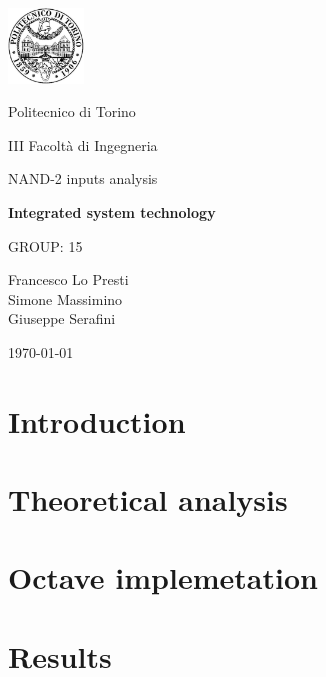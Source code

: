 \documentclass[12pt,  english, makeidx, a4paper, titlepage, oneside]{article}
\begin{document}
\begin{titlepage}
\vspace{2cm}
\centerline{
\includegraphics[width=2cm]{./img/logopoli.eps}}  
\centerline{\LARGE Politecnico di Torino}
\bigskip
\centerline{\Large III Facolt\`a di Ingegneria}
\vspace{4cm}
\centerline{\Huge\sf NAND-2 inputs analysis}
\bigskip
\centerline{\Huge\bfseries\sf Integrated system technology}
\vspace{2cm}
\centerline{\Large GROUP: 15}
\vspace{2cm}
\centerline{\Large Francesco Lo Presti\\Simone Massimino\\Giuseppe Serafini}
\vspace{2cm}
\centerline{\Large \today}
\end{titlepage}

\tableofcontents

\newpage

\lstset{language=Matlab}

\newpage
\section{Introduction}


\section{Theoretical analysis}


\newpage
\section{Octave implemetation}


\newpage
\section{Results}


\newpage

\end{document}
